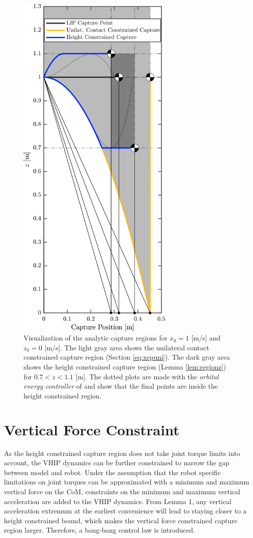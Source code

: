 \begin{figure}
      \centering
      \includegraphics[width=3in]{STYLESTUFF/CPLimitsDark1.png}
      \caption{Visualization of the analytic capture regions for $\dot{x}_0=1$ [m/s] and $\dot{z}_0=0$ [m/s]. The light gray area shows the unilateral contact constrained capture region (Section \ref{eq:xcpuni}). The dark gray area shows the height constrained capture region (Lemma \ref{lem:regionz})  for $0.7<z<1.1$ [m]. The dotted plots are made with the \textit{orbital energy controller} of \cite{koolen2016balance} and show that the final points are inside the height constrained region.}
      \label{fig:capregion}
\end{figure}

\section{Vertical Force Constraint}\label{sec:verticalforce}
As the height constrained capture region does not take joint torque limits into account, the \ac{VHIP} dynamics can be further constrained to narrow the gap between model and robot. Under the assumption that the robot specific limitations on joint torques can be approximated with a minimum and maximum vertical force on the \ac{CoM}, constraints on the minimum and maximum vertical acceleration are added to the \ac{VHIP} dynamics. From Lemma 1, any vertical acceleration extremum at the earliest convenience will lead to staying closer to a height constrained bound, which makes the vertical force constrained capture region larger. Therefore, a bang-bang control law is introduced.
     
